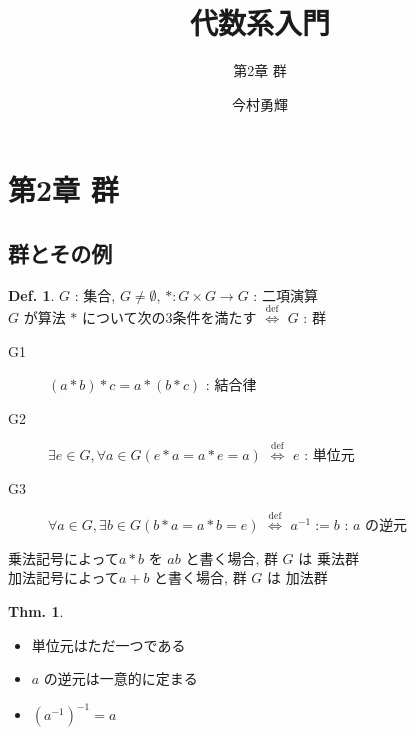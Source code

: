 \documentclass[uplatex,dvipdfmx,9pt]{beamer}
\title{代数系入門}
\subtitle{第2章 群}
\author{今村勇輝}
\newcommand{\defarrow}{\overset{\mathrm{def}}{\Leftrightarrow}}
\newcounter{textExmCount}
\theoremstyle{definition} %
\newtheorem{defn}{Def.}[subsection] %
\newtheorem{thm}{Thm.}[subsection] %
\theoremstyle{example}
\begin{document}
  \begin{frame}[plain]
    \titlepage
  \end{frame}

  \section{第2章 群}
  \setcounter{subsection}{1}

    \subsection{\textsection \thesubsection 群とその例}
    \setcounter{textExmCount}{0}

      \begin{frame}

        \begin{defn}
          $G$ : 集合, $G \ne \emptyset$, $* : G \times G \rightarrow G$ : 二項演算 \\
          $G$ が算法 $*$ について次の3条件を満たす $\defarrow$ $G$ : \alert{群}
          \begin{description}
            \item[G1] $(a * b) * c = a * (b * c)$ : 結合律
            \item[G2] $\exists e \in G, \forall a \in G (e * a = a * e = a)$ $\defarrow$ $e$ : \alert{単位元}
            \item[G3] $\forall a \in G, \exists b \in G (b * a = a * b = e)$ $\defarrow$ $a^{-1} := b$ : $a$ の\alert{逆元}
          \end{description}
        \end{defn}
        乗法記号によって$a * b$ を $ab$ と書く場合, 群 $G$ は \alert{乗法群} \\
        加法記号によって$a + b$ と書く場合,  群 $G$ は \alert{加法群}

        \begin{thm}
          \begin{itemize}
            \item 単位元はただ一つである
            \item $a$ の逆元は一意的に定まる
            \item $(a^{-1})^{-1} = a$
          \end{itemize}
        \end{thm}

      \end{frame}
\end{document}
